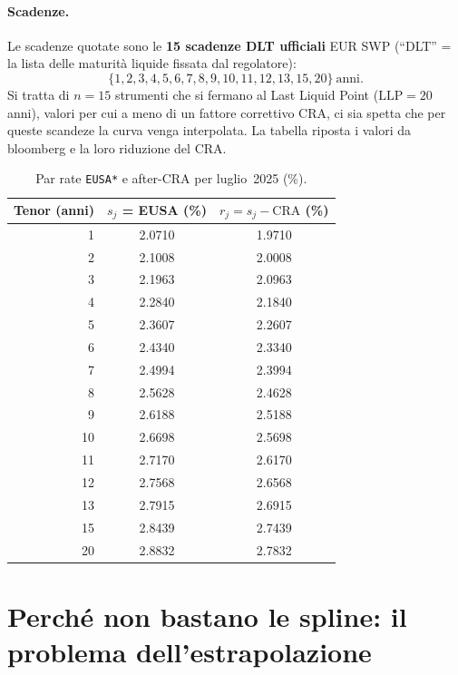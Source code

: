 \documentclass[11pt,a4paper]{article}
\theoremstyle{plain}
\theoremstyle{definition}
\theoremstyle{remark}
\newcommand{\LLP}{\ensuremath{\mathrm{LLP}}}
\newcommand{\CRA}{\ensuremath{\mathrm{CRA}}}
\begin{document}
\paragraph{Scadenze.} Le scadenze quotate sono le \textbf{15 scadenze DLT ufficiali} EUR SWP
(``DLT'' = la lista delle maturit\`a liquide fissata dal regolatore):
\[
  \{1,2,3,4,5,6,7,8,9,10,11,12,13,15,20\}\ \text{anni}.
\]
Si tratta di $n=15$ strumenti che si fermano al Last Liquid Point ($\LLP = 20$ anni), valori per cui a meno di un fattore correttivo CRA, ci sia spetta che per queste scandeze la curva venga interpolata. La tabella riposta i valori da bloomberg e la loro riduzione del CRA.

\begin{table}[H]
\centering\small
\caption{Par rate \texttt{EUSA*} e after-CRA per luglio~2025 (\%).}
\label{tab:input-jul}
\renewcommand{\arraystretch}{1.15}
\begin{tabular}{rcc}
\toprule
\textbf{Tenor} (anni) & $s_j$ = EUSA (\%) & $r_j = s_j - \CRA$ (\%)\\
\midrule
 1  & 2.0710 & 1.9710\\
 2  & 2.1008 & 2.0008\\
 3  & 2.1963 & 2.0963\\
 4  & 2.2840 & 2.1840\\
 5  & 2.3607 & 2.2607\\
 6  & 2.4340 & 2.3340\\
 7  & 2.4994 & 2.3994\\
 8  & 2.5628 & 2.4628\\
 9  & 2.6188 & 2.5188\\
10  & 2.6698 & 2.5698\\
11  & 2.7170 & 2.6170\\
12  & 2.7568 & 2.6568\\
13  & 2.7915 & 2.6915\\
15  & 2.8439 & 2.7439\\
20  & 2.8832 & 2.7832\\
\bottomrule
\end{tabular}
\end{table}


\section{Perch\'e non bastano le spline: il problema dell'estrapolazione}
\label{sec:spline-limite}
\end{document}
